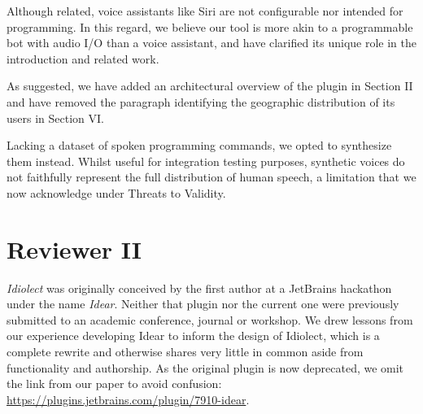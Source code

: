 \documentclass[journal,12pt,onecolumn,draftclsnofoot,]{IEEEtran}
\begin{document}
%
%
%

Although related, voice assistants like Siri are not configurable nor intended for programming. In this regard, we believe our tool is more akin to a programmable bot with audio I/O than a voice assistant, and have clarified its unique role in the introduction and related work.

As suggested, we have added an architectural overview of the plugin in Section II and have removed the paragraph identifying the geographic distribution of its users in Section VI.



Lacking a dataset of spoken programming commands, we opted to synthesize them instead. Whilst useful for integration testing purposes, synthetic voices do not faithfully represent the full distribution of human speech, a limitation that we now acknowledge under Threats to Validity.

\section{Reviewer II}

\textit{Idiolect} was originally conceived by the first author at a JetBrains hackathon under the name \textit{Idear}. Neither that plugin nor the current one were previously submitted to an academic conference, journal or workshop. We drew lessons from our experience developing Idear to inform the design of Idiolect, which is a complete rewrite and otherwise shares very little in common aside from functionality and authorship. As the original plugin is now deprecated, we omit the link from our paper to avoid confusion: \url{https://plugins.jetbrains.com/plugin/7910-idear}.
\end{document}
